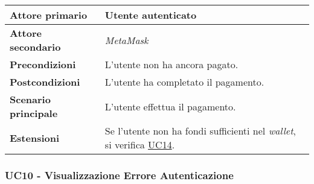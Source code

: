             \begin{center}
                \renewcommand{\arraystretch}{1.5}
                \begin{tabular}{m{10em} m{20em}}
                    \hline
                    \textbf{Attore primario} & Utente autenticato \\
                    \hline
                    \textbf{Attore secondario} & \textit{MetaMask} \\
                    \hline
                    \textbf{Precondizioni} & L'utente non ha ancora pagato. \\
                    \hline
                    \textbf{Postcondizioni} & L'utente ha completato il pagamento. \\
                    \hline
                    \textbf{Scenario principale} & L'utente effettua il pagamento. \\
                    \hline
                    \textbf{Estensioni} & Se l'utente non ha fondi sufficienti nel \textit{wallet}, si verifica \hyperref[UC14]{UC14}.\\
                    \hline
                \end{tabular}
            \end{center}

        \subsubsection{UC10 - Visualizzazione Errore Autenticazione}
        \label{UC10}

